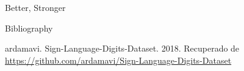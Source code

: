 \documentclass{beamer}
\begin{document}
\begin{darkframes}
\begin{frame}{Better, Stronger}
\end{frame}



    \begin{frame}[label=bibliography]{Bibliography}
      \begin{thebibliography}{9}
            ardamavi.
            Sign-Language-Digits-Dataset.
            2018.
            Recuperado de \url{https://github.com/ardamavi/Sign-Language-Digits-Dataset}
      \end{thebibliography}
    \end{frame}

  \end{darkframes}
\end{document}
